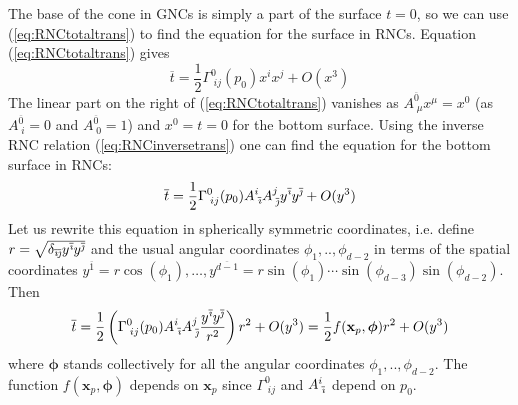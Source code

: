 \documentclass[12pt]{article}
\newcommand{\be}{\begin{equation}}
\newcommand{\ee}{\end{equation}}
\newcommand{\ibar}{{\overline{\emph\i}}}
\newcommand{\jbar}{{\overline{\emph\j}}}
\begin{document}
The base of the cone in GNCs is simply a part of the surface $t=0$, so we can use (\ref{eq:RNCtotaltrans}) to find the equation for the surface in RNCs. Equation (\ref{eq:RNCtotaltrans}) gives
\be\label{eq:BottomSurfaceWithGNC}
\overline{t}=\frac{1}{2}\Gamma^{0}_{\;ij} (p_0)x^i x^j+O ( x^3)
\ee
The linear part on the right of (\ref{eq:RNCtotaltrans}) vanishes as $A^{\overline{0}}_{\;\mu}x^{\mu}=x^0$ (as $A^{\overline{0}}_{\;i}=0$ and $A^{\overline{0}}_{\;0}=1$) and $x^0=t=0$ for the bottom surface. Using the inverse RNC relation (\ref{eq:RNCinversetrans}) one can find the equation for the bottom surface in RNCs:
\be\label{eq:BottomSurface}
\overline{t}=\frac{1}{2}\Gamma^{0}_{\;ij} (p_0)A^{i}_{\;\ibar}A^{j}_{\;\jbar}y^{\ibar} y^{\jbar}+O (y^3)
\ee
Let us rewrite this equation in spherically symmetric coordinates, i.e. define $r=\sqrt{\delta_{\ibar\jbar}y^\ibar y^\jbar}$ and the usual angular coordinates $\phi_1,..,\phi_{d-2}$ in terms of the spatial coordinates $y^{\overline{1}} = r \cos (\phi_1),\ldots, y^{\overline{d-1}} = r \sin (\phi_1) \cdots \sin (\phi_{d-3}) \sin (\phi_{d-2})$. Then
\be\label{eq:RadialBottomSurface}
\overline{t}=\frac{1}{2}\left (\Gamma^{0}_{\;ij} (p_0)A^{i}_{\;\ibar}A^{j}_{\;\jbar}\frac{y^{\ibar} y^{\jbar}}{r^2}\right)r^2+O (y^3)=\frac{1}{2}f (\mathbf{x}_p,{\boldsymbol\phi})r^2+O (y^3)
\ee
where $\boldsymbol\phi$ stands collectively for all the angular coordinates $\phi_1,..,\phi_{d-2}$. The function $f (\mathbf{x}_p,\boldsymbol\phi)$ depends on $\mathbf{x}_p$ since $\Gamma^{0}_{\;ij}$ and $A^{i}_{\;\ibar}$ depend on $p_0$.
\end{document}
